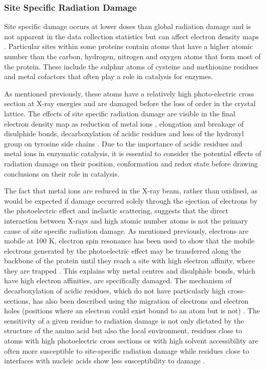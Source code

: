 \subsubsection{Site Specific Radiation Damage}\label{sec:specific_damage}
Site specific damage occurs at lower doses than global radiation damage and is not apparent in the data collection statistics but can affect electron density maps \cite{Ravelli2000}. Particular sites within some proteins contain atoms that have a higher atomic number than the carbon, hydrogen, nitrogen and oxygen atoms that form most of the protein. These include the sulphur atoms of cysteine and methionine residues and metal cofactors that often play a role in catalysis for enzymes. 

As mentioned previously, these atoms have a relatively high photo-electric cross section at X-ray energies and are damaged before the loss of order in the crystal lattice. The effects of site specific radiation damage are visible in the final electron density map as reduction of metal ions \cite{Berglund2002}, elongation and breakage of disulphide bonds, decarboxylation of acidic residues and loss of the hydroxyl group on tyrosine side chains \cite{Berglund2002,Ravelli2000,Burmeister2000}. Due to the importance of acidic residues and metal ions in enzymatic catalysis, it is essential to consider the potential effects of radiation damage on their position, conformation and redox state before drawing conclusions on their role in catalysis.      \par

The fact that metal ions are reduced in the X-ray beam, rather than oxidised, as would be expected if damage occurred solely through the ejection of electrons by the photoelectric effect and inelastic scattering, suggests that the direct interaction between X-rays and high atomic number atoms is not the primary cause of site specific radiation damage. As mentioned previously, electrons are mobile at 100 \si{\kelvin}, electron spin resonance has been used to show that the mobile electrons generated by the photoelectric effect may be transferred along the backbone of the protein until they reach a site with high electron affinity, where they are trapped \cite{Jones1987}. This explains why metal centres and disulphide bonds, which have high electron affinities, are specifically damaged. The mechanism of decarboxylation of acidic residues, which do not have particularly high cross-sections, has also been described using the migration of electrons and electron holes (positions where an electron could exist bound to an atom but is not) \cite{Burmeister2000}. The sensitivity of a given residue to radiation damage is not only dictated by the structure of the amino acid but also the local environment, residues close to atoms with high photoelectric cross sections or with high solvent accessibility are often more susceptible to site-specific radiation damage while residues close to interfaces with nucleic acids show less susceptibility to damage \cite{Gerstel2015,Bury2016}. 

